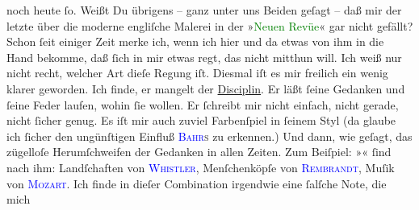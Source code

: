                noch heute ſo.\pend
           \pstart
           Weißt Du übrigens – ganz unter uns Beiden geſagt – daß mir der letzte \label{K_L02627-44v}\label{K_L02627-44h} über die moderne engliſche Malerei in der »\textcolor{green}{Neuen Revüe}{}\ledrightnote{\textcolor{green}{Neue Revue. Wiener Literatur-Zeitung}}« gar nicht gefällt? Schon ſeit
               einiger Zeit merke ich, wenn ich hier und  da etwas von ihm in die Hand bekomme, daß ſich in mir etwas regt, das nicht
               mitthun will. Ich weiß nur nicht {\pb}recht, welcher Art
               dieſe Regung iſt. Diesmal iſt es mir freilich \textcolor{gray}{} ein wenig klarer geworden. Ich finde, er mangelt der \uline{Disciplin}. Er läßt ſeine Gedanken und ſeine Feder laufen, wohin ſie
               wollen. Er ſchreibt mir nicht einfach, nicht gerade, nicht ſicher genug. Es iſt mir
               auch zuviel Farbenſpiel in ſeinem  Styl (da
               glaube ich ſicher den ungünſtigen Einfluß \textsc{\textcolor{blue}{Bahr}{}\ledrightnote{\textcolor{blue}{Hermann Bahr}}s} zu erkennen.) Und dann, wie
               geſagt, das zügelloſe Herumſchweifen der Gedanken in allen Zeiten. Zum Beiſpiel:
                  »\label{K_L02627-4v}\label{K_L02627-4h}«
               ſind nach ihm: Landſchaften von \textsc{\textcolor{blue}{Whistler}{}\ledrightnote{\textcolor{blue}{James McNeill Whistler}}}, Menſchenköpſe von \textsc{\textcolor{blue}{Rembrandt}{}\ledrightnote{\textcolor{blue}{Rembrandt van Rijn}}}, Muſik von \textsc{\textcolor{blue}{Mozart}{}\ledrightnote{\textcolor{blue}{Wolfgang Amadeus Mozart}}}. Ich finde in dieſer Combination irgendwie eine ſalſche Note, die mich
